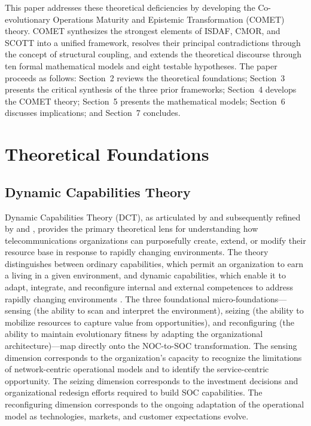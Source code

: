 \documentclass[12pt,a4paper]{article}
\begin{document}
This paper addresses these theoretical deficiencies by developing the Co-evolutionary Operations Maturity and Epistemic Transformation (COMET) theory. COMET synthesizes the strongest elements of ISDAF, CMOR, and SCOTT into a unified framework, resolves their principal contradictions through the concept of structural coupling, and extends the theoretical discourse through ten formal mathematical models and eight testable hypotheses. The paper proceeds as follows: Section~2 reviews the theoretical foundations; Section~3 presents the critical synthesis of the three prior frameworks; Section~4 develops the COMET theory; Section~5 presents the mathematical models; Section~6 discusses implications; and Section~7 concludes.

\section{Theoretical Foundations}

\subsection{Dynamic Capabilities Theory}

Dynamic Capabilities Theory (DCT), as articulated by \citet{teece1997dynamic} and subsequently refined by \citet{teece2007explicating} and \citet{teece2018business}, provides the primary theoretical lens for understanding how telecommunications organizations can purposefully create, extend, or modify their resource base in response to rapidly changing environments. The theory distinguishes between ordinary capabilities, which permit an organization to earn a living in a given environment, and dynamic capabilities, which enable it to adapt, integrate, and reconfigure internal and external competences to address rapidly changing environments \citep{teece1997dynamic}. The three foundational micro-foundations---sensing (the ability to scan and interpret the environment), seizing (the ability to mobilize resources to capture value from opportunities), and reconfiguring (the ability to maintain evolutionary fitness by adapting the organizational architecture)---map directly onto the NOC-to-SOC transformation. The sensing dimension corresponds to the organization's capacity to recognize the limitations of network-centric operational models and to identify the service-centric opportunity. The seizing dimension corresponds to the investment decisions and organizational redesign efforts required to build SOC capabilities. The reconfiguring dimension corresponds to the ongoing adaptation of the operational model as technologies, markets, and customer expectations evolve.
\end{document}
